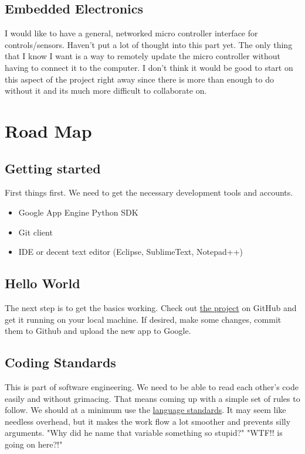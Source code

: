 \documentclass[a4paper,12pt]{article}
\begin{document}
\subsection{Embedded Electronics}
I would like to have a general, networked  micro controller interface for controls/sensors. Haven't put a lot of thought into this part yet. The only thing that I know I want is a way to remotely update the micro controller without having to connect it to the computer. I don't think it would be good to start on this aspect of the project right away since there is more than enough to do without it and its much more difficult to collaborate on.

\section{Road Map}

\subsection{Getting started}
First things first. We need to get the necessary development tools and accounts.

\begin{itemize}
 \item Google App Engine Python SDK
 \item Git client
 \item IDE or decent text editor (Eclipse, SublimeText, Notepad++)
\end{itemize}

\subsection{Hello World}
The next step is to get the basics working. Check out \href{https://github.com/TacoMike/BeerWebApp}{the project} on GitHub and get it running on your local machine. If desired, make some changes, commit them to Github and upload the new app to Google.

\subsection{Coding Standards}
This is part of software engineering. We need to be able to read each other's code easily and without grimacing. That means coming up with a simple set of rules to follow. We should at a minimum use the \href{http://docs.python-guide.org/en/latest/writing/style/}{language standards}. It may seem like needless overhead, but it makes the work flow a lot smoother and prevents silly arguments. "Why did he name that variable something so stupid?" "WTF!! is going on here?!" 
\end{document}

